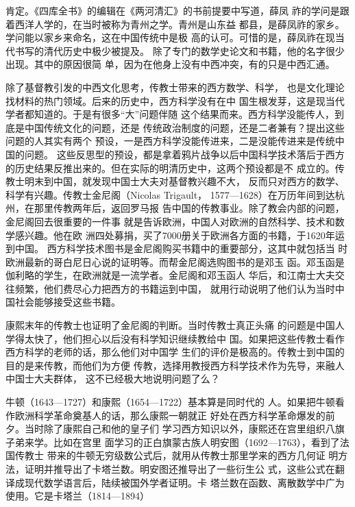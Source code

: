 肯定。《四库全书》的编辑在《两河清汇》的书前提要中写道，薛凤%
祚的学问是跟着西洋人学的，在当时被称为青州之学。青州是山东益%
都县，是薛凤祚的家乡。学问能以家乡来命名，这在中国传统中是极%
高的认可。可惜的是，薛凤祚在现当代书写的清代历史中极少被提及。%
除了专门的数学史论文和书籍，他的名字很少出现。其中的原因很简%
单，因为在他身上没有中西冲突，有的只是中西汇通。%
\par
除了基督教引发的中西文化思考，传教士带来的西方数学、科学，%
也是文化理论找材料的热门领域。后来的历史中，西方科学没有在中%
国生根发芽，这是现当代学者都知道的。于是有很多“大”问题伴随%
这个结果而来。西方科学没能传人，到底是中国传统文化的问题，还是%
传统政治制度的问题，还是二者兼有？提出这些问题的人其实有两个%
预设，一是西方科学没能传进来，二是没能传进来是传统中国的问题。%
这些反思型的预设，都是拿着鸦片战争以后中国科学技术落后于西方%
的历史结果反推出来的。但在实际的明清历史中，这两个预设都是不%
成立的。传教士明末到中国，就发现中国士大夫对基督教兴趣不大，%
反而只对西方的数学、科学有兴趣。传教士金尼阁（Nicolas Trigault，%
1577—1628）在万历年间到达杭州，在那里传教两年后，返回罗马报%
告中国的传教事业。除了教会内部的问题，金尼阁回去很重要的一件事%
就是告诉欧洲，中国人对欧洲的自然科学、技术和数学感兴趣。他在欧%
洲四处募捐，买了7000册关于欧洲各方面的书籍，于1620年运到中国。%
西方科学技术图书是金尼阁购买书籍中的重要部分，这其中就包括当%
时欧洲最新的哥白尼日心说的证明等。而帮金尼阁选购图书的是邓玉%
函。邓玉函是伽利略的学生，在欧洲就是一流学者。金尼阁和邓玉函人%
华后，和江南士大夫交往频繁，他们费尽心力把西方的书籍运到中国，%
就用行动说明了他们认为当时中国社会能够接受这些书籍。%
\par
康熙末年的传教士也证明了金尼阁的判断。当时传教士真正头痛%
的问题是中国人学得太快了，他们担心以后没有科学知识继续教给中%
国。如果把这些传教士看作西方科学的老师的话，那么他们对中国学%
生们的评价是极高的。传教士到中国的目的是来传教，而他们为方便%
传教，选择用教授西方科学技术作为先导，来融人中国士大夫群体，%
这不已经极大地说明问题了么？%
\par
牛顿（1643—1727）和康熙（1654—1722）基本算是同时代的%
人。如果把牛顿看作欧洲科学革命奠基人的话，那么康熙一朝就正%
好处在西方科学革命爆发的前夕。当时除了康熙自己和他的皇子们%
学习西方知识以外，康熙还在宫里组织八旗子弟来学。比如在宫里%
面学习的正白旗蒙古族人明安图（1692—1763），看到了法国传教士%
带来的牛顿无穷级数公式后，就用从传教士那里学来的西方几何证%
明方法，证明并推导出了卡塔兰数。明安图还推导出了一些衍生公%
式，这些公式在翻译成现代数学语言后，陆续被国外学者证明。卡%
塔兰数在函数、离散数学中广为使用。它是卡塔兰（1814—1894）%
